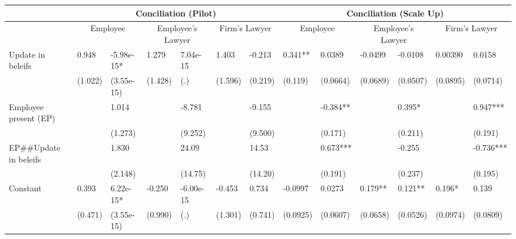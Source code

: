 \begin{tabular}{lllllllcccccc}
      & \multicolumn{6}{c}{Conciliation (Pilot)}      & \multicolumn{6}{c}{Conciliation (Scale Up)} \\
\midrule
      & \multicolumn{2}{c}{Employee} & \multicolumn{2}{c}{Employee's Lawyer} & \multicolumn{2}{c}{Firm's Lawyer} & \multicolumn{2}{c}{Employee} & \multicolumn{2}{c}{Employee's Lawyer} & \multicolumn{2}{c}{Firm's Lawyer} \\
\midrule
\midrule
Update in beleifs & 0.948 & -5.98e-15* & 1.279 & 7.04e-15 & 1.403 & -0.213 & \multicolumn{1}{l}{0.341**} & \multicolumn{1}{l}{0.0389} & \multicolumn{1}{l}{-0.0499} & \multicolumn{1}{l}{-0.0108} & \multicolumn{1}{l}{0.00390} & \multicolumn{1}{l}{0.0158} \\
      & (1.022) & (3.55e-15) & (1.428) & (.)   & (1.596) & (0.219) & \multicolumn{1}{l}{(0.119)} & \multicolumn{1}{l}{(0.0664)} & \multicolumn{1}{l}{(0.0689)} & \multicolumn{1}{l}{(0.0507)} & \multicolumn{1}{l}{(0.0895)} & \multicolumn{1}{l}{(0.0714)} \\
Employee present (EP) &       & 1.014 &       & -8.781 &       & -9.155 & \multicolumn{1}{l}{} & \multicolumn{1}{l}{-0.384**} & \multicolumn{1}{l}{} & \multicolumn{1}{l}{0.395*} & \multicolumn{1}{l}{} & \multicolumn{1}{l}{0.947***} \\
      &       & (1.273) &       & (9.252) &       & (9.500) & \multicolumn{1}{l}{} & \multicolumn{1}{l}{(0.171)} & \multicolumn{1}{l}{} & \multicolumn{1}{l}{(0.211)} & \multicolumn{1}{l}{} & \multicolumn{1}{l}{(0.191)} \\
EP\#\#Update in beleifs &       & 1.830 &       & 24.09 &       & 14.53 & \multicolumn{1}{l}{} & \multicolumn{1}{l}{0.673***} & \multicolumn{1}{l}{} & \multicolumn{1}{l}{-0.255} & \multicolumn{1}{l}{} & \multicolumn{1}{l}{-0.736***} \\
      &       & (2.148) &       & (14.75) &       & (14.20) & \multicolumn{1}{l}{} & \multicolumn{1}{l}{(0.191)} & \multicolumn{1}{l}{} & \multicolumn{1}{l}{(0.237)} & \multicolumn{1}{l}{} & \multicolumn{1}{l}{(0.195)} \\
Constant  & 0.393 & 6.22e-15* & -0.250 & -6.00e-15 & -0.453 & 0.734 & \multicolumn{1}{l}{-0.0997} & \multicolumn{1}{l}{0.0273} & \multicolumn{1}{l}{0.179**} & \multicolumn{1}{l}{0.121**} & \multicolumn{1}{l}{0.196*} & \multicolumn{1}{l}{0.139} \\
      & (0.471) & (3.55e-15) & (0.990) & (.)   & (1.301) & (0.741) & \multicolumn{1}{l}{(0.0925)} & \multicolumn{1}{l}{(0.0607)} & \multicolumn{1}{l}{(0.0658)} & \multicolumn{1}{l}{(0.0526)} & \multicolumn{1}{l}{(0.0974)} & \multicolumn{1}{l}{(0.0809)} \\

\end{tabular}
